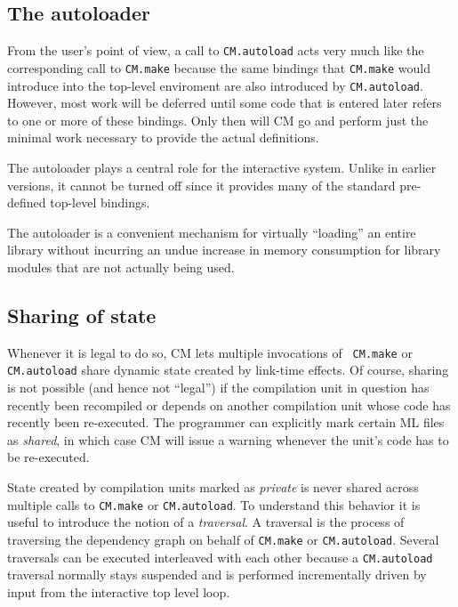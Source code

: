 \documentclass[titlepage,letterpaper]{article}
\begin{document}
\subsection{The autoloader}
\label{sec:autoload}

From the user's point of view, a call to {\tt CM.autoload} acts very
much like the corresponding call to {\tt CM.make} because the same
bindings that {\tt CM.make} would introduce into the top-level
enviroment are also introduced by {\tt CM.autoload}.  However, most
work will be deferred until some code that is entered later refers to
one or more of these bindings.  Only then will CM go and perform just
the minimal work necessary to provide the actual definitions.

The autoloader plays a central role for the interactive system.
Unlike in earlier versions, it cannot be turned off since it provides
many of the standard pre-defined top-level bindings.

The autoloader is a convenient mechanism for virtually ``loading'' an
entire library without incurring an undue increase in memory
consumption for library modules that are not actually being used.

\subsection{Sharing of state}
\label{sec:sharing}

Whenever it is legal to do so, CM lets multiple invocations of {\tt
CM.make} or {\tt CM.autoload} share dynamic state created by link-time
effects.  Of course, sharing is not possible (and hence not ``legal'')
if the compilation unit in question has recently been recompiled or
depends on another compilation unit whose code has recently been
re-executed.  The programmer can explicitly mark certain ML files as
{\em shared}, in which case CM will issue a warning whenever the
unit's code has to be re-executed.

State created by compilation units marked as {\em private} is never
shared across multiple calls to {\tt CM.make} or {\tt CM.autoload}.
To understand this behavior it is useful to introduce the notion of a
{\em traversal}.  A traversal is the process of traversing the
dependency graph on behalf of {\tt CM.make} or {\tt CM.autoload}.
Several traversals can be executed interleaved with each other because
a {\tt CM.autoload} traversal normally stays suspended and is
performed incrementally driven by input from the interactive top level
loop.
\end{document}
